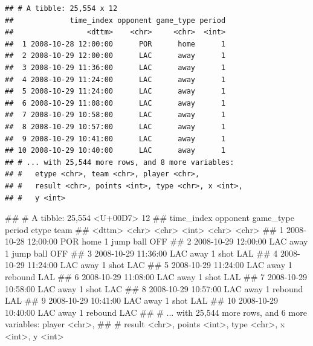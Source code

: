 \documentclass[10pt,]{krantz}
\makeatletter
\newenvironment{Shaded}{\begin{snugshade}}{\end{snugshade}}
\newcommand{\KeywordTok}[1]{\textcolor[rgb]{0.13,0.29,0.53}{\textbf{#1}}}
\newcommand{\StringTok}[1]{\textcolor[rgb]{0.31,0.60,0.02}{#1}}
\newcommand{\CommentTok}[1]{\textcolor[rgb]{0.56,0.35,0.01}{\textit{#1}}}
\newcommand{\OperatorTok}[1]{\textcolor[rgb]{0.81,0.36,0.00}{\textbf{#1}}}
\newcommand{\NormalTok}[1]{#1}
\newenvironment{kframe}{%
\medskip{}
\setlength{\fboxsep}{.8em}
 \def\at@end@of@kframe{}%
 \ifinner\ifhmode%
  \def\at@end@of@kframe{\end{minipage}}%
  \begin{minipage}{\columnwidth}%
 \fi\fi%
 \def\FrameCommand##1{\hskip\@totalleftmargin \hskip-\fboxsep
 \colorbox{shadecolor}{##1}\hskip-\fboxsep
     \hskip-\linewidth \hskip-\@totalleftmargin \hskip\columnwidth}%
 \MakeFramed {\advance\hsize-\width
   \@totalleftmargin\z@ \linewidth\hsize
   \@setminipage}}%
 {\par\unskip\endMakeFramed%
 \at@end@of@kframe}
\renewenvironment{Shaded}{\begin{kframe}}{\end{kframe}}
\makeatother
\begin{document}
\begin{Shaded}
\end{Shaded}

\begin{verbatim}
## # A tibble: 25,554 x 12
##             time_index opponent game_type period
##                 <dttm>    <chr>     <chr>  <int>
##  1 2008-10-28 12:00:00      POR      home      1
##  2 2008-10-29 12:00:00      LAC      away      1
##  3 2008-10-29 11:36:00      LAC      away      1
##  4 2008-10-29 11:24:00      LAC      away      1
##  5 2008-10-29 11:24:00      LAC      away      1
##  6 2008-10-29 11:08:00      LAC      away      1
##  7 2008-10-29 10:58:00      LAC      away      1
##  8 2008-10-29 10:57:00      LAC      away      1
##  9 2008-10-29 10:41:00      LAC      away      1
## 10 2008-10-29 10:40:00      LAC      away      1
## # ... with 25,544 more rows, and 8 more variables:
## #   etype <chr>, team <chr>, player <chr>,
## #   result <chr>, points <int>, type <chr>, x <int>,
## #   y <int>
\end{verbatim}

\begin{Shaded}
\begin{Highlighting}[]
\NormalTok{## # A tibble: 25,554 <U+00D7> 12}
\NormalTok{##             time_index opponent game_type period     etype  team}
\NormalTok{##                 <dttm>    <chr>     <chr>  <int>     <chr> <chr>}
\NormalTok{## 1  2008-10-28 12:00:00      POR      home      1 jump ball   OFF}
\NormalTok{## 2  2008-10-29 12:00:00      LAC      away      1 jump ball   OFF}
\NormalTok{## 3  2008-10-29 11:36:00      LAC      away      1      shot   LAL}
\NormalTok{## 4  2008-10-29 11:24:00      LAC      away      1      shot   LAC}
\NormalTok{## 5  2008-10-29 11:24:00      LAC      away      1   rebound   LAL}
\NormalTok{## 6  2008-10-29 11:08:00      LAC      away      1      shot   LAL}
\NormalTok{## 7  2008-10-29 10:58:00      LAC      away      1      shot   LAC}
\NormalTok{## 8  2008-10-29 10:57:00      LAC      away      1   rebound   LAL}
\NormalTok{## 9  2008-10-29 10:41:00      LAC      away      1      shot   LAL}
\NormalTok{## 10 2008-10-29 10:40:00      LAC      away      1   rebound   LAC}
\NormalTok{## # ... with 25,544 more rows, and 6 more variables: player <chr>,}
\NormalTok{## #   result <chr>, points <int>, type <chr>, x <int>, y <int>}
\end{Highlighting}
\end{Shaded}
\end{document}
